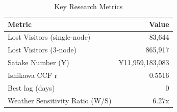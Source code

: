 \begin{table}[htbp]
\centering
\caption{Key Research Metrics}
\label{tab:key_metrics}
\begin{tabular}{lr}
\toprule
Metric & Value \\
\midrule
  Lost Visitors (single-node) & 83,644 \\
  Lost Visitors (3-node) & 865,917 \\
  Satake Number (¥) & ¥11,959,183,083 \\
  Ishikawa CCF r & 0.5516 \\
  Best lag (days) & 0 \\
  Weather Sensitivity Ratio (W/S) & 6.27x \\
\bottomrule
\end{tabular}
\end{table}